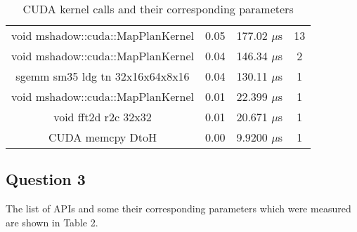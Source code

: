 \documentclass[12pt,titlepage]{article}
\begin{document}
\begin{table}[h!]
\begin{tabular}{||c | c | c | c||}
		void mshadow::cuda::MapPlanKernel                                                                         & 0.05     & 177.02 $\mu$s & 13    \\
		void mshadow::cuda::MapPlanKernel                                                                         & 0.04     & 146.34 $\mu$s & 2     \\
		sgemm  \textunderscore  sm35  \textunderscore  ldg  \textunderscore  tn  \textunderscore  32x16x64x8x16   & 0.04     & 130.11 $\mu$s & 1     \\
		void mshadow::cuda::MapPlanKernel                                                                         & 0.01     & 22.399 $\mu$s & 1     \\
		void fft2d  \textunderscore  r2c  \textunderscore  32x32                                                  & 0.01     & 20.671 $\mu$s & 1     \\
		CUDA  \textunderscore  memcpy  \textunderscore  DtoH                                                      & 0.00     & 9.9200 $\mu$s & 1     \\[1ex]
		\hline
		\hline
	\end{tabular}
	\caption{CUDA kernel calls and their corresponding parameters}
\end{table}


\pagebreak
\subsection*{Question 3}

The list of APIs and some their corresponding parameters which were measured are shown in Table 2.
\end{document}
